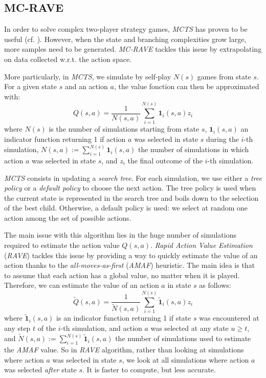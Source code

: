 \documentclass[journal, a4paper]{IEEEtran}
\begin{document}
\subsection{MC-RAVE}
\label{ssec:mc-rave}
In order to solve complex two-player strategy games, \textit{MCTS} has proven to be useful (cf. \cite{mcts-review}). However, when the state and branching complexities grow large, more samples need to be generated. \textit{MC-RAVE}\cite{mc-rave} tackles this issue by extrapolating on data collected w.r.t. the action space.

More particularly, in \textit{MCTS}, we simulate by self-play $N(s)$ games from state $s$. For a given state $s$ and an action $a$, the value fonction can then be approximated with:
$$Q(s,a) = \frac{1}{N(s,a)} \sum_{i=1}^{N(s)} \mathbf{1}_{i}(s,a)z_i$$
where $N(s)$ is the number of simulations starting from state $s$, $\mathbf{1}_{i}(s,a)$ an indicator function returning 1 if action $a$ was selected in state $s$ during the $i$-th simulation, $N(s,a):=\sum_{i=1}^{N(s)} \mathbf{1}_{i}(s,a)$ the number of simulations in which action $a$ was selected in state $s$, and $z_i$ the final outcome of the $i$-th simulation.

\textit{MCTS} consists in updating a \textit{search tree}. For each simulation, we use either a \textit{tree policy} or a \textit{default policy} to choose the next action. The tree policy is used when the current state is represented in the search tree and boils down to the selection of the best child. Otherwise, a default policy is used: we select at random one action among the set of possible actions.

The main issue with this algorithm lies in the huge number of simulations required to estimate the action value $Q(s,a)$. \textit{Rapid Action Value Estimation} (\textit{RAVE}) \cite{mc-rave} tackles this issue by providing a way to quickly estimate the value of an action thanks to the \textit{all-moves-as-first} (\textit{AMAF}) heuristic. The main idea is that to assume that each action has a global value, no matter when it is played. Therefore, we can estimate the value of an action $a$ in state $s$ as follows:
$$\tilde Q(s,a) = \frac{1}{\tilde N(s,a)} \sum_{i=1}^{N(s)} \mathbf{\tilde 1}_{i}(s,a)z_i$$
where $\mathbf{\tilde 1}_{i}(s,a)$ is an indicator function returning 1 if state $s$ was encountered at any step $t$ of the $i$-th simulation, and action $a$ was selected at any state $u\geq t$, and $\tilde N(s,a):=\sum_{i=1}^{N(s)} \mathbf{\tilde 1}_{i}(s,a)$ the number of simulations used to estimate the \textit{AMAF} value. So in \textit{RAVE} algorithm, rather than looking at simulations where action $a$ was selected in state $s$, we look at all simulations where action $a$ was selected \textit{after} state $s$. It is faster to compute, but less accurate.
\end{document}
